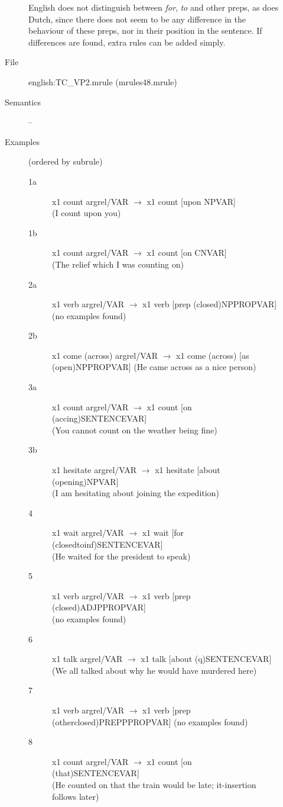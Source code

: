 \begin{description}
\begin{description}
English does not distinguish between {\em for\/}, {\em to\/} and other preps, as 
does Dutch, since there does not seem to be any difference in the behaviour of 
these preps, nor in their position in the sentence. If differences are found, 
extra rules can be added simply.

\item[File] english:TC\_VP2.mrule (mrules48.mrule)
\item[Semantics] --
\item[Examples] (ordered by subrule)
  \begin{description}
  \item[1a] x1 count argrel/VAR $\rightarrow$ x1 count [upon NPVAR] \\
(I count upon you)
  \item[1b] x1 count argrel/VAR $\rightarrow$ x1 count [on CNVAR] \\
(The relief which I was counting on)
  \item[2a] x1 verb argrel/VAR $\rightarrow$ x1 verb [prep (closed)NPPROPVAR] 
\\ (no examples found)
  \item[2b] x1 come (across) argrel/VAR $\rightarrow$ x1 come (across) [as
(open)NPPROPVAR] 
(He came across as a nice person) 
  \item[3a] x1 count argrel/VAR $\rightarrow$ x1 count [on (accing)SENTENCEVAR] 
\\
(You cannot count on the weather being fine)
  \item[3b] x1 hesitate argrel/VAR $\rightarrow$ x1 hesitate [about
(opening)NPVAR] \\
(I am hesitating about joining the expedition)
  \item[4] x1 wait argrel/VAR $\rightarrow$ x1 wait [for 
(closedtoinf)SENTENCEVAR] \\
(He waited for the president to speak)
  \item[5] x1 verb argrel/VAR $\rightarrow$ x1 verb [prep
(closed)ADJPPROPVAR] \\
(no examples found)
  \item[6] x1 talk argrel/VAR $\rightarrow$ x1 talk [about (q)SENTENCEVAR] \\
(We all talked about why he would have murdered here)
  \item[7] x1 verb argrel/VAR $\rightarrow$ x1 verb [prep
(otherclosed)PREPPPROPVAR] 
(no examples found)
  \item[8] x1 count argrel/VAR $\rightarrow$ x1 count [on (that)SENTENCEVAR] \\
(He counted on that the train would be late; it-insertion follows later)
  \end{description}


\end{description}
\end{description}

